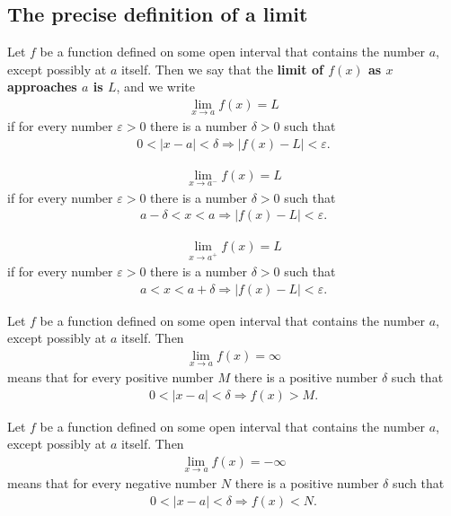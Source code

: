 \documentclass{article}
\begin{document}
\subsection{The precise definition of a limit}
\begin{definition}
	Let $f$ be a function defined on some open interval that contains the number $a$, except possibly at $a$ itself. Then we say that the \textbf{limit of $f(x)$ as $x$ approaches $a$ is $L$}, and we write
	\begin{align*}
		\lim_{x\to a}f(x) = L
	\end{align*}
	if for every number $\varepsilon>0$ there is a number $\delta>0$ such that
	\begin{align*}
		0<|x-a|<\delta \Rightarrow |f(x)-L|<\varepsilon.
	\end{align*}
\end{definition}
\begin{definition}
	\begin{align*}
		\lim_{x\to a^-}f(x) = L
	\end{align*}
	if for every number $\varepsilon > 0$ there is a number $\delta > 0$ such that
	\begin{align*}
		a-\delta < x < a \Rightarrow |f(x)-L| < \varepsilon.
	\end{align*}
\end{definition}
\begin{align*}
	\lim_{x\to a^+}f(x) = L
\end{align*}
if for every number $\varepsilon > 0$ there is a number $\delta > 0$ such that
\begin{align*}
	a < x < a+\delta \Rightarrow |f(x)-L| < \varepsilon.
\end{align*}
\begin{definition}
	Let $f$ be a function defined on some open interval that contains the number $a$, except possibly at $a$ itself. Then
	\begin{align*}
		\lim_{x\to a}f(x) = \infty
	\end{align*}
	means that for every positive number $M$ there is a positive number $\delta$ such that
	\begin{align*}
		0<|x-a|<\delta \Rightarrow f(x)>M.
	\end{align*}
\end{definition}
\begin{definition}
	Let $f$ be a function defined on some open interval that contains the number $a$, except possibly at $a$ itself. Then
	\begin{align*}
		\lim_{x\to a}f(x) = -\infty
	\end{align*}
	means that for every negative number $N$ there is a positive number $\delta$ such that
	\begin{align*}
		0<|x-a|<\delta \Rightarrow f(x)<N.
	\end{align*}
\end{definition}
\end{document}

